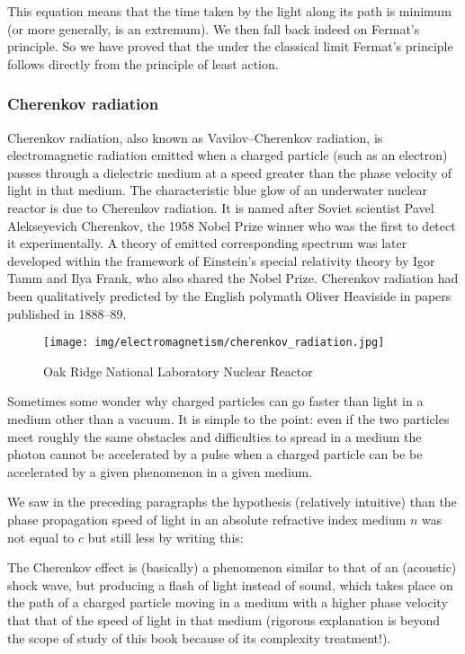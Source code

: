 	This equation means that the time taken by the light along its path is minimum (or more generally, is an extremum). We then fall back indeed on Fermat's principle. So we have proved that the under the classical limit  Fermat's principle follows directly from the principle of least action.
	
	\pagebreak
	\subsubsection{Cherenkov radiation}
	Cherenkov radiation, also known as Vavilov–Cherenkov radiation, is electromagnetic radiation emitted when a charged particle (such as an electron) passes through a dielectric medium at a speed greater than the phase velocity of light in that medium. The characteristic blue glow of an underwater nuclear reactor is due to Cherenkov radiation. It is named after Soviet scientist Pavel Alekseyevich Cherenkov, the 1958 Nobel Prize winner who was the first to detect it experimentally. A theory of emitted corresponding spectrum was later developed within the framework of Einstein's special relativity theory by Igor Tamm and Ilya Frank, who also shared the Nobel Prize. Cherenkov radiation had been qualitatively predicted by the English polymath Oliver Heaviside in papers published in 1888–89.
	
	\begin{figure}[H]
		\centering
		\texttt{[image: img/electromagnetism/cherenkov\_radiation.jpg]}
		\caption{Oak Ridge National Laboratory Nuclear Reactor}
	\end{figure}
	\begin{tcolorbox}[title=Remark,colframe=black,arc=10pt]
	Sometimes some wonder why charged particles can go faster than light in a medium other than a vacuum. It is simple to the point: even if the two particles meet roughly the same obstacles and difficulties to spread in a medium the photon cannot be accelerated by a pulse when a charged particle can be be accelerated by a given phenomenon in a given medium.
	\end{tcolorbox}
	We saw in the preceding paragraphs the hypothesis (relatively intuitive) than the phase propagation speed of light in an absolute refractive index medium $n$ was not equal to $c$ but still less by writing this:
	
	The Cherenkov effect is (basically) a phenomenon similar to that of an (acoustic) shock wave, but producing a flash of light instead of sound, which takes place on the path of a charged particle moving in a medium with a higher phase velocity that that of the speed of light in that medium (rigorous explanation is beyond the scope of study of this book because of its complexity treatment!).

